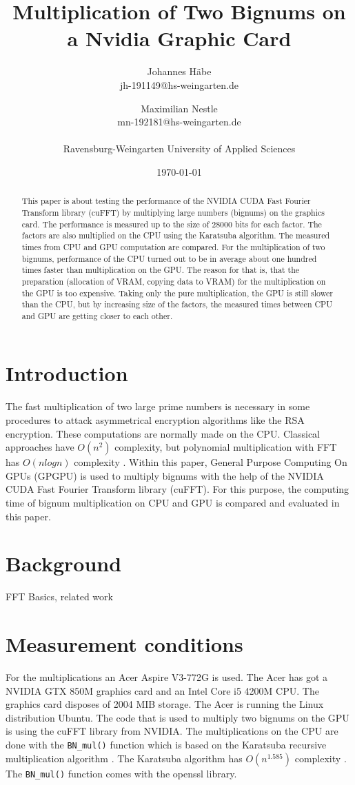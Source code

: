 \documentclass[12pt,a4paper]{article}
\title{Multiplication of Two Bignums on a Nvidia Graphic Card}
\author{Johannes H\"abe  \\
	jh-191149@hs-weingarten.de
	\and 
	Maximilian Nestle \\
	mn-192181@hs-weingarten.de \\\\
	Ravensburg-Weingarten University of Applied Sciences
	}
\date{\today}
\begin{document}
\maketitle
%
\begin{abstract}
This paper is about testing the performance of the NVIDIA CUDA Fast Fourier Transform library (cuFFT) by multiplying large numbers (bignums) on the graphics card. The performance is measured up to the size of 28000 bits for each factor. The factors are also multiplied on the CPU using the Karatsuba algorithm. The measured times from CPU and GPU computation are compared. For the multiplication of two bignums, performance of the CPU turned out to be in average about one hundred times faster than multiplication on the GPU. The reason for that is, that the preparation (allocation of VRAM, copying data to VRAM) for the multiplication on the GPU is too expensive. Taking only the  pure multiplication, the GPU is still slower than the CPU, but by increasing size of the factors, the measured times between CPU and GPU are getting closer to each other.
\end{abstract}

\section{Introduction}
The fast multiplication of two large prime numbers is necessary in some procedures to attack asymmetrical encryption algorithms like the RSA encryption. These computations are normally made on the CPU. Classical approaches have $O(n^2)$ complexity, but polynomial multiplication with FFT has $O(nlogn)$ complexity \cite{bantikyan2014big}. Within this paper, General Purpose Computing On GPUs (GPGPU) is used to multiply bignums with the help of the NVIDIA CUDA Fast Fourier Transform library (cuFFT). For this purpose, the computing time of bignum multiplication on CPU and GPU is compared and evaluated in this paper.

\section{Background}
FFT Basics, related work

\section{Measurement conditions}
For the multiplications an Acer Aspire V3-772G is used. The Acer has got a NVIDIA GTX 850M graphics card and an Intel Core i5 4200M CPU. The graphics card disposes of 2004 MIB storage. The Acer is running the Linux distribution Ubuntu. The code that is used to multiply two bignums on the GPU is using the cuFFT library from NVIDIA. The multiplications on the CPU are done with the \texttt{BN_mul()} function which is based on the Karatsuba recursive multiplication algorithm \cite{young1995bnmul}. The Karatsuba algorithm has $O(n^{1.585})$ complexity \cite{dietzfelbinger2012eff}. The \texttt{BN_mul()} function comes with the openssl library.
\end{document}
